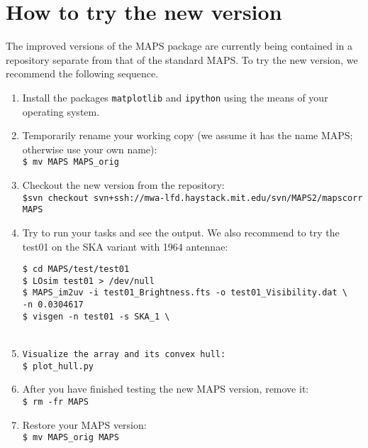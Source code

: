 \documentclass[letterpaper, oneside, 11pt]{article}
\begin{document}
\section{How to try the new version}

The improved versions of the MAPS package are currently being contained in a repository separate from that of the standard MAPS. To try the new version, we recommend the following sequence.
\begin{enumerate}
 \item Install the packages {\tt matplotlib} and {\tt ipython} using the means of your operating system. \\
 \item Temporarily rename your working copy (we assume it has the name MAPS; otherwise use your own name):\\
{\tt \$ mv MAPS MAPS\_orig} \\
 \item Checkout the new version from the repository: \\
{\tt \$svn checkout svn+ssh://mwa-lfd.haystack.mit.edu/svn/MAPS2/mapscorr MAPS}\\
 \item Try to run your tasks and see the output. We also recommend to try the {test01} on the SKA variant with 1964 antennae:
\begin{tabbing}
{\tt \$ cd MAPS/test/test01} \\
{\tt \$ LOsim test01 > /dev/null} \\
{\tt \$ MAPS\_im2uv -i test01\_Brightness.fts -o test01\_Visibility.dat  \textbackslash }\\ 
\hspace{15mm} \={\tt -n 0.0304617} \\
{\tt \$ visgen -n test01 -s SKA\_1 \textbackslash} \\ 
 \\
\end{tabbing}
 \item {\tt Visualize the array and its convex hull:} \\
{\tt \$ plot\_hull.py} \\
 \item After you have finished testing the new MAPS version, remove it: \\
{\tt \$ rm -fr MAPS} \\
 \item Restore your MAPS version: \\
{\tt \$ mv MAPS\_orig MAPS}
\end{enumerate}
\end{document}
